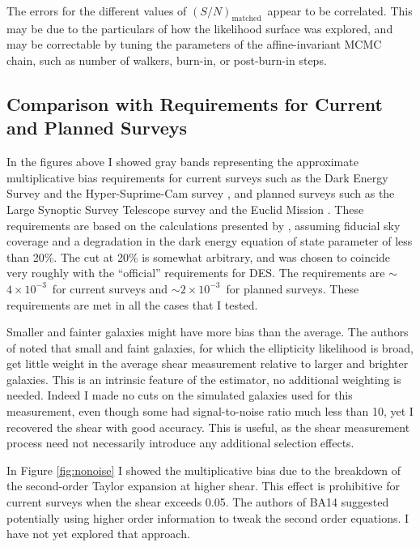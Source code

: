 \documentclass[usegraphicx,usenatbib]{mn2e}
\newcommand{\Msn}{$(S/N)_{\textrm{matched}}$}
\newcommand{\desreq}{$4\times 10^{-3}$}
\newcommand{\lsstreq}{$2\times 10^{-3}$}
\begin{document}
The errors for the different values of \Msn\ appear to be correlated.  This may
be due to the particulars of how the likelihood surface was explored, and may be
correctable by tuning the parameters of the affine-invariant MCMC chain, such
as number of walkers, burn-in, or post-burn-in steps.

\subsection{Comparison with Requirements for Current and Planned Surveys}
\label{sec:req}

In the figures above I showed gray bands representing the approximate
multiplicative bias requirements for current surveys such as the Dark Energy
Survey \citep[][DES]{DESWhitePaper} and the Hyper-Suprime-Cam survey
\citep[][HSC]{HSC12}, and planned surveys such as the Large Synoptic Survey
Telescope survey \citep[][LSST]{IvezicLSST08} and the Euclid Mission
\citep{Euclid2011}.  These requirements are based on the calculations presented
by \citet{HutererSystematics06}, assuming fiducial sky coverage and a
degradation in the dark energy equation of state parameter of less than 20\%.
The cut at 20\% is somewhat arbitrary, and was chosen to coincide very roughly
with the ``official'' requirements for DES. The requirements are $\sim$\desreq\
for current surveys and $\sim$\lsstreq\ for planned surveys.  These
requirements are met in all the cases that I tested.

Smaller and fainter galaxies might have more bias than the average.  The
authors of \cite{ba14} noted that small and faint galaxies, for which the
ellipticity likelihood is broad, get little weight in the average shear
measurement relative to larger and brighter galaxies.  This is an intrinsic
feature of the estimator, no additional weighting is needed.  Indeed I made no
cuts on the simulated galaxies used for this measurement, even though some had
signal-to-noise ratio much less than 10, yet I recovered the shear with good
accuracy.  This is useful, as the shear measurement process need not
necessarily introduce any additional selection effects.

In Figure \ref{fig:nonoise} I showed the multiplicative bias due to the
breakdown of the second-order Taylor expansion at higher shear.   This effect
is prohibitive for current surveys when the shear exceeds 0.05.  The authors of
BA14 suggested potentially using higher order information to tweak the second
order equations.  I have not yet explored that approach.
\end{document}
